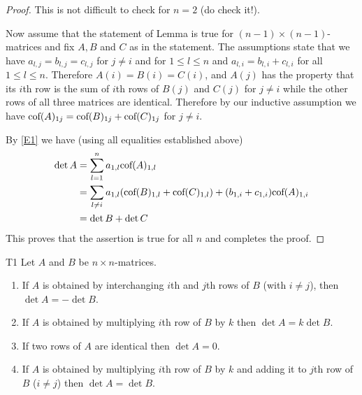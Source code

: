 \begin{proof} 
This is not difficult to check for $n=2$ (do check it!). 

Now assume that the statement of Lemma is true for $(n-1)\times (n-1)$-matrices and 
fix $A,B$ and $C$ as in the statement. 
The assumptions state that 
we have  $a_{l,j}=b_{l,j}=c_{l,j}$ for $j\neq i$ and for $1\leq l\leq n$
and $a_{l,i}=b_{l,i}+c_{l,i}$ for all $1\leq l\leq n$. 
Therefore $A(i)=B(i)=C(i)$, and $A(j)$ has the property that 
its $i$th row is the sum of $i$th rows of $B(j)$ and $C(j)$ for $j\neq i$ while the  other rows of all three matrices are identical.  
Therefore by our inductive assumption we have $\mbox{\rm cof}(A)_{1j}=\mbox{\rm cof}(B)_{1j}+\mbox{\rm cof}(C)_{1j}$
for $j\neq i$. 

By \eqref{E1} we have (using all equalities established above) 
\begin{align*}
\det A&=\sum_{l=1}^n a_{1,l} \mbox{\rm cof}(A)_{1,l}\\
 &=\sum_{l\neq i} a_{1,l}(\mbox{\rm cof}(B)_{1,l}+\mbox{\rm cof}(C)_{1,l})+ 
(b_{1,i}+c_{1,i})\mbox{\rm cof}(A)_{1,i}\\
&=
\det B+\det C
\end{align*}
This proves that the assertion is true for all $n$ and completes the proof.  
\end{proof} 

\begin{theorem}{} {T1} 
Let $A$ and $B$ be $n\times n$-matrices. 
\begin{enumerate}
\item If $A$ is obtained by interchanging $i$th and $j$th rows  of $B$ (with $i\neq j$), then $\det A=-\det B$. 
\item If $A$ is obtained by multiplying $i$th row of $B$ by $k$ then $\det A=k\det B$. 
\item If two rows of $A$ are identical then $\det A=0$. 
\item If $A$ is obtained by multiplying $i$th row of $B$ by $k$ and adding it to 
$j$th row of $B$ ($i\neq j$) then $\det A=\det B$. 
\end{enumerate}
\end{theorem}

